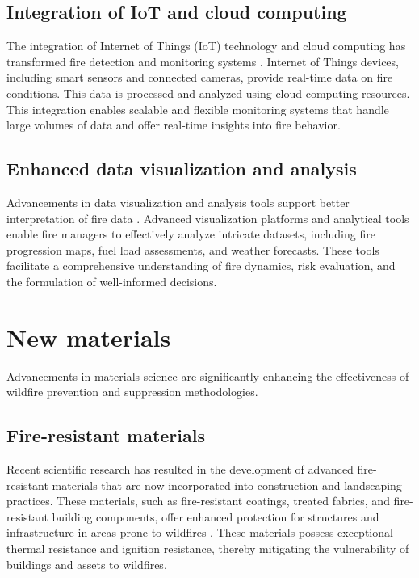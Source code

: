 \documentclass[
  12 pt,
]{Nemilov}
\begin{document}
\subsection{Integration of IoT and cloud computing}\label{integration-of-iot-and-cloud-computing}

The integration of Internet of Things (IoT) technology and cloud computing has transformed fire detection and monitoring systems \citep{bushnaq2021role, zope2020iot}. Internet of Things devices, including smart sensors and connected cameras, provide real-time data on fire conditions. This data is processed and analyzed using cloud computing resources. This integration enables scalable and flexible monitoring systems that handle large volumes of data and offer real-time insights into fire behavior.

\subsection{Enhanced data visualization and analysis}\label{enhanced-data-visualization-and-analysis}

Advancements in data visualization and analysis tools support better interpretation of fire data \citep{ahrens1997case, crawl2017firemap, mccormick1998visualization}. Advanced visualization platforms and analytical tools enable fire managers to effectively analyze intricate datasets, including fire progression maps, fuel load assessments, and weather forecasts. These tools facilitate a comprehensive understanding of fire dynamics, risk evaluation, and the formulation of well-informed decisions.

\section{New materials}\label{new-materials}

Advancements in materials science are significantly enhancing the effectiveness of wildfire prevention and suppression methodologies.

\subsection{Fire-resistant materials}\label{fire-resistant-materials}

Recent scientific research has resulted in the development of advanced fire-resistant materials that are now incorporated into construction and landscaping practices. These materials, such as fire-resistant coatings, treated fabrics, and fire-resistant building components, offer enhanced protection for structures and infrastructure in areas prone to wildfires \citep{fedosov2020fire, garver1962fire, kilinc2013handbook}. These materials possess exceptional thermal resistance and ignition resistance, thereby mitigating the vulnerability of buildings and assets to wildfires.
\end{document}
